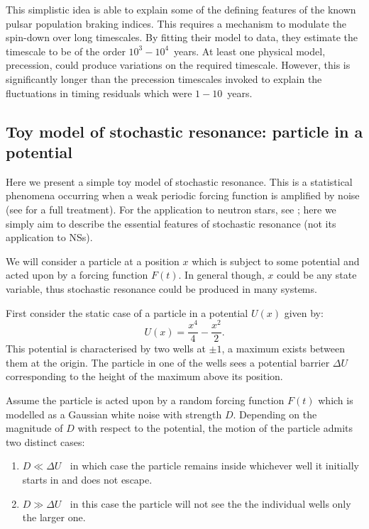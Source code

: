 This simplistic idea is able to explain some of the defining features of the
known pulsar population braking indices. This requires a mechanism to modulate
the spin-down over long timescales. By fitting their model to data, they
estimate the timescale to be of the order $10^{3}-10^{4}$~years. At least one
physical model, precession, could produce variations on the required timescale.
However, this is significantly longer than the precession timescales invoked to
explain the fluctuations in timing residuals which were $1-10$~years.
\begin{subappendices}
\subsection{Toy model of stochastic resonance: particle in a potential}
\label{app: stochastic}

Here we present a simple toy model of stochastic resonance. This is a
statistical phenomena occurring when a weak periodic forcing function is
amplified by noise (see \citet{Jung1991} for a full treatment).  For the
application to neutron stars, see \citet{Cordes2013}; here we simply aim to
describe the essential features of stochastic resonance (not its application to
NSs).

We will consider a particle at a position $x$ which is subject to some
potential and acted upon by a forcing function $F(t)$. In general though, $x$
could be any state variable, thus stochastic resonance could be produced
in many systems.

First consider the static case of a particle in a potential $U(x)$  given by:
\begin{equation}
    U(x) = \frac{x^{4}}{4}-\frac{x^{2}}{2}.
\end{equation}
This potential is characterised by two wells at $\pm1$, a maximum exists
between them at the origin. The particle in one of the wells sees a potential
barrier $\Delta U$ corresponding to the height of the maximum above its
position.

Assume the particle is acted upon by a random forcing function $F(t)$ which is
modelled as a Gaussian white noise with strength $D$. Depending on the
magnitude of $D$ with respect to the potential, the motion of the particle
admits two distinct cases:
\begin{enumerate}
\item $D \ll \Delta U \;\;$ in which case the particle remains inside whichever
    well it initially starts in and does not escape.
\item $D \gg \Delta U \;\;$ in this case the particle will not see the the
    individual wells only the larger one.
\end{enumerate}


\end{subappendices}
